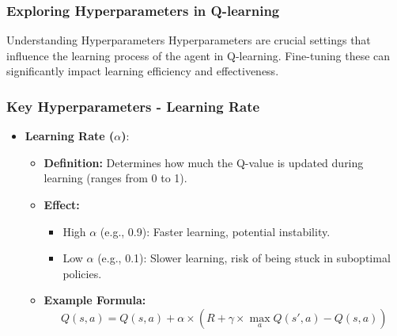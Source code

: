 \documentclass{beamer}
\begin{document}
\begin{frame}[fragile]
    \frametitle{Exploring Hyperparameters in Q-learning}
    \begin{block}{Understanding Hyperparameters}
        Hyperparameters are crucial settings that influence the learning process of the agent in Q-learning. 
        Fine-tuning these can significantly impact learning efficiency and effectiveness.
    \end{block}
\end{frame}

\begin{frame}[fragile]
    \frametitle{Key Hyperparameters - Learning Rate}
    \begin{itemize}
        \item \textbf{Learning Rate ($\alpha$)}:
        \begin{itemize}
            \item \textbf{Definition:} Determines how much the Q-value is updated during learning (ranges from 0 to 1).
            \item \textbf{Effect:}
                \begin{itemize}
                    \item High $\alpha$ (e.g., 0.9): Faster learning, potential instability.
                    \item Low $\alpha$ (e.g., 0.1): Slower learning, risk of being stuck in suboptimal policies.
                \end{itemize}
            \item \textbf{Example Formula:}
            \begin{equation}
                Q(s, a) = Q(s, a) + \alpha \times (R + \gamma \times \max_a Q(s', a) - Q(s, a))
            \end{equation}
        \end{itemize}
    \end{itemize}
\end{frame}
\end{document}
